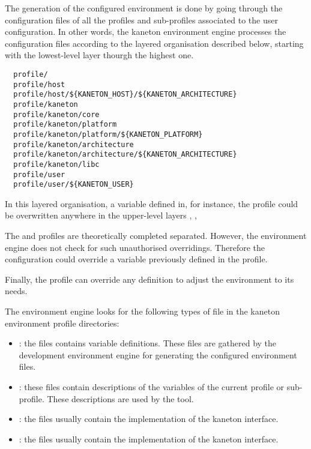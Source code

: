 The generation of the configured environment is done by going through
the configuration files of all the profiles and sub-profiles associated
to the user configuration. In other words, the kaneton environment engine
processes the configuration files according to the layered organisation
described below, starting with the lowest-level layer thourgh the highest one.

\begin{verbatim}
  profile/
  profile/host
  profile/host/${KANETON_HOST}/${KANETON_ARCHITECTURE}
  profile/kaneton
  profile/kaneton/core
  profile/kaneton/platform
  profile/kaneton/platform/${KANETON_PLATFORM}
  profile/kaneton/architecture
  profile/kaneton/architecture/${KANETON_ARCHITECTURE}
  profile/kaneton/libc
  profile/user
  profile/user/${KANETON_USER}         
\end{verbatim}

In this layered organisation, a variable defined in, for instance, the
 profile could be overwritten anywhere in the upper-level layers
,
, 
\etc{}

The  and  profiles are theoretically completed
separated. However, the environment engine does not check for such
unauthorised overridings. Therefore the  configuration could
override a variable previously defined in the  profile.

Finally, the  profile can override any definition to adjust the
environment to its needs.

The environment engine looks for the following types of file in the
kaneton environment profile directories:

\begin{itemize}
  \item
    : the  files contains variable
    definitions. These files are gathered by the development environment
    engine for generating the configured environment files.
  \item
    : these  files contain descriptions of
    the variables of the current profile or sub-profile. These descriptions
    are used by the  tool.
  \item
    : the  files usually contain the implementation
    of the kaneton  interface.
  \item
    : the  files usually contain the
    implementation of the kaneton  interface.
\end{itemize}

